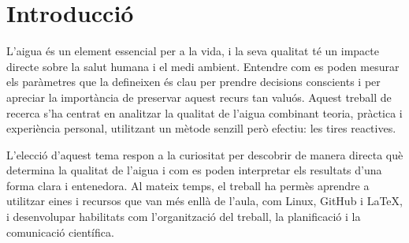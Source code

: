 \chapter{Introducció}
\label{c:intro}
%
%
%
%

L’aigua és un element essencial per a la vida, i la seva qualitat té un impacte directe sobre la salut humana i el medi ambient. Entendre com es poden mesurar els paràmetres que la defineixen és clau per prendre decisions conscients i per apreciar la importància de preservar aquest recurs tan valuós. Aquest treball de recerca s’ha centrat en analitzar la qualitat de l’aigua combinant teoria, pràctica i experiència personal, utilitzant un mètode senzill però efectiu: les tires reactives.

L’elecció d’aquest tema respon a la curiositat per descobrir de manera directa què determina la qualitat de l’aigua i com es poden interpretar els resultats d’una forma clara i entenedora. Al mateix temps, el treball ha permès aprendre a utilitzar eines i recursos que van més enllà de l’aula, com Linux, GitHub i \LaTeX, i desenvolupar habilitats com l’organització del treball, la planificació i la comunicació científica.

